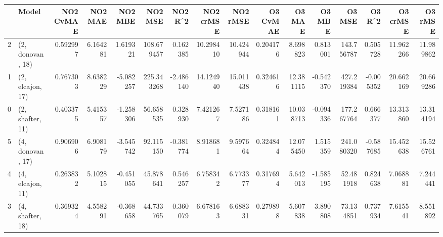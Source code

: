 \begin{tabular}{llrrrrrrrrrrrrrr}
\toprule
{} &             Model &  NO2 CvMAE &   NO2 MAE &   NO2 MBE &     NO2 MSE &   NO2 R\textasciicircum2 &  NO2 crMSE &   NO2 rMSE &  O3 CvMAE &     O3 MAE &    O3 MBE &      O3 MSE &    O3 R\textasciicircum2 &   O3 crMSE &    O3 rMSE \\
\midrule
2 &  (2, donovan, 18) &   0.592997 &  6.164281 &  1.619321 &  108.679457 &  0.162385 &  10.298410 &  10.424944 &  0.204176 &   8.698823 &  0.813001 &  143.756787 &  0.505728 &  11.962266 &  11.989862 \\
1 &  (2, elcajon, 17) &   0.767303 &  8.638229 & -5.082257 &  225.343268 & -2.486140 &  14.124940 &  15.011438 &  0.324616 &  12.381115 & -0.542370 &  427.219384 & -0.005352 &  20.662169 &  20.669286 \\
0 &  (2, shafter, 11) &   0.403375 &  5.415357 & -1.258306 &   56.658535 &  0.328930 &   7.421267 &   7.527186 &  0.318161 &  10.038713 & -0.094336 &  177.267764 &  0.666377 &  13.313860 &  13.314194 \\
5 &  (4, donovan, 17) &   0.906906 &  6.908179 & -3.545742 &   92.115150 & -0.381774 &   8.918681 &   9.597664 &  0.324844 &  12.075450 &  1.515359 &  241.080320 & -0.587685 &  15.452638 &  15.526761 \\
4 &  (4, elcajon, 11) &   0.263832 &  5.102815 & -0.451055 &   45.878641 &  0.546257 &   6.758342 &   6.773377 &  0.317694 &   5.642013 & -1.585195 &   52.481918 &  0.824638 &   7.068881 &   7.244441 \\
3 &  (4, shafter, 18) &   0.369324 &  4.558291 & -0.368658 &   44.733765 &  0.360079 &   6.678163 &   6.688331 &  0.279898 &   5.607838 &  3.890808 &   73.134851 &  0.737934 &   7.615541 &   8.551892 \\
\bottomrule
\end{tabular}
